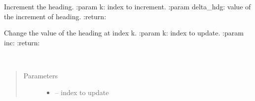 \documentclass[letterpaper,10pt,english]{sphinxmanual}
\begin{document}
\begin{fulllineitems}

\begin{fulllineitems}
\label{\detokenize{package1:Simulator.Simulator.getTimeStep}}
\end{fulllineitems}


\begin{fulllineitems}
\label{\detokenize{package1:Simulator.Simulator.incrementDelayHdg}}
\end{fulllineitems}


\begin{fulllineitems}
\label{\detokenize{package1:Simulator.Simulator.incrementHdg}}
Increment the heading.
:param k: index to increment.
:param delta\_hdg: value of the increment of heading.
:return:

\end{fulllineitems}


\begin{fulllineitems}
\label{\detokenize{package1:Simulator.Simulator.plot}}
\end{fulllineitems}


\begin{fulllineitems}
\label{\detokenize{package1:Simulator.Simulator.updateHdg}}
Change the value of the heading at index k.
:param k: index to update.
:param inc:
:return:

\end{fulllineitems}


\begin{fulllineitems}
\label{\detokenize{package1:Simulator.Simulator.updateVMG}}~\begin{quote}\begin{description}
\item[{Parameters}] \leavevmode\begin{itemize}
\item {} 
 -- index to update


\end{itemize}
\end{description}
\end{quote}
\end{fulllineitems}
\end{fulllineitems}
\end{document}
